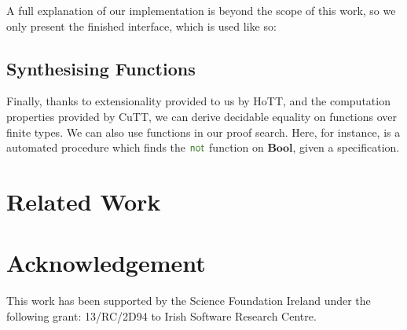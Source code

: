 A full explanation of our implementation is beyond the scope of this work, so we
only present the finished interface, which is used like so:
\subsection{Synthesising Functions}
Finally, thanks to extensionality provided to us by HoTT, and the computation
properties provided by CuTT, we can derive decidable equality on functions over
finite types.
We can also use functions in our proof search.
Here, for instance, is a automated procedure which finds the
\(\AgdaFunction{not}\) function on \(\mathbf{Bool}\), given a specification.
\section{Related Work}
\section*{Acknowledgement}
This work has been supported by the Science Foundation Ireland under the
following grant: 13/RC/2D94 to Irish Software Research Centre.


 